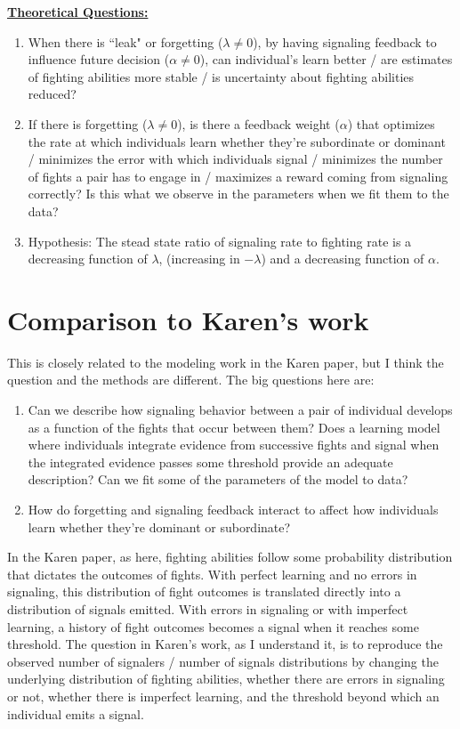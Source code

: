 \documentclass{article}
\begin{document}
\underline{\bf Theoretical Questions:}
\begin{enumerate}
\item{When there is ``leak" or forgetting ($\lambda\neq 0$), by having signaling feedback to influence future decision ($\alpha\neq 0$), can individual's learn better / are estimates of fighting abilities more stable / is uncertainty about fighting abilities reduced? }
\item{If there is forgetting ($\lambda\neq 0$), is there a feedback weight ($\alpha$) that optimizes the rate at which individuals learn whether they're subordinate or dominant / minimizes the error with which individuals signal / minimizes the number of fights a pair has to engage in / maximizes a reward coming from signaling correctly?  Is this what we observe in the parameters when we fit them to the data?}
\item{Hypothesis: The stead state ratio of signaling rate to fighting rate is a decreasing function of $\lambda$, (increasing in $-\lambda$) and a decreasing function of $\alpha$.}
\end{enumerate}

\section{Comparison to Karen's work}
This is closely related to the modeling work in the Karen paper, but I think the question and the methods are different.  The big questions here are:

\begin{enumerate}
\item{Can we describe how signaling behavior between a pair of individual develops as a function of the fights that occur between them?  Does a learning model where individuals integrate evidence from successive fights and signal when the integrated evidence passes some threshold provide an adequate description?  Can we fit some of the parameters of the model to data?}
\item{How do forgetting and signaling feedback interact to affect how individuals learn whether they're dominant or subordinate?}
\end{enumerate}

In the Karen paper, as here, fighting abilities follow some probability distribution that dictates the outcomes of fights.  With perfect learning and no errors in signaling, this distribution of fight outcomes is translated directly into a distribution of signals emitted.  With errors in signaling or with imperfect learning, a history of fight outcomes becomes a signal when it reaches some threshold.  The question in Karen's work, as I understand it, is to reproduce the observed number of signalers / number of signals distributions by changing the underlying distribution of fighting abilities, whether there are errors in signaling or not, whether there is imperfect learning, and the threshold beyond which an individual emits a signal.  
\end{document}
